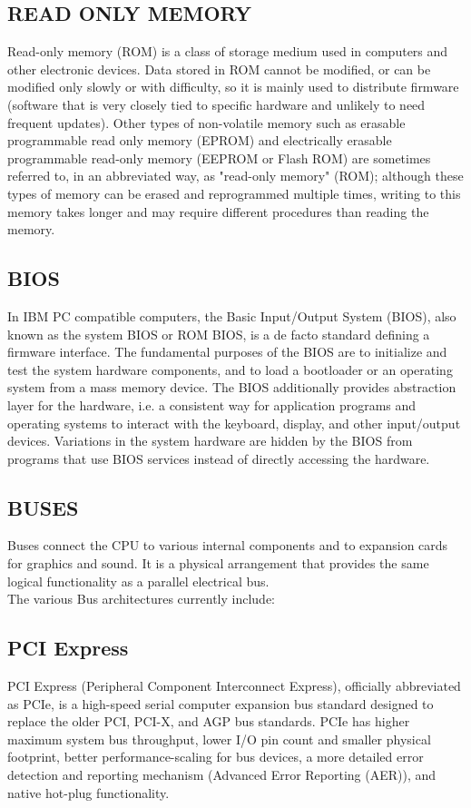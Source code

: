 		\subsection*{READ ONLY MEMORY}
	Read-only memory (ROM) is a class of storage medium used in computers and other electronic devices. Data
	stored in ROM cannot be modified, or can be modified only slowly or with difficulty, so it is mainly used to
	distribute firmware (software that is very closely tied to specific hardware and unlikely to need frequent
	updates). Other types of non-volatile memory such as erasable programmable read only memory (EPROM)
	and electrically erasable programmable read-only memory (EEPROM or Flash ROM) are sometimes referred to,
	in an abbreviated way, as "read-only memory" (ROM); although these types of memory can be erased and reprogrammed
	multiple times, writing to this memory takes longer and may require different procedures than
	reading the memory.
		\subsection*{BIOS}
	In IBM PC compatible computers, the Basic Input/Output System (BIOS), also known as the system
	BIOS or ROM BIOS, is a de facto standard defining a firmware interface. The fundamental purposes of the
	BIOS are to initialize and test the system hardware components, and to load a bootloader or an operating
	system from a mass memory device. The BIOS additionally provides abstraction layer for the hardware, i.e. a
	consistent way for application programs and operating systems to interact with the keyboard, display, and other
	input/output devices. Variations in the system hardware are hidden by the BIOS from programs that use BIOS
	services instead of directly accessing the hardware.
		\subsection*{BUSES}
	Buses connect the CPU to various internal components and to expansion cards for graphics and sound. It is a
	physical arrangement that provides the same logical functionality as a parallel electrical bus.\\
	The various Bus architectures currently include:
			\subsection*{PCI Express}
 	PCI Express (Peripheral Component Interconnect Express), officially abbreviated as PCIe, is
	 a high-speed serial computer expansion bus standard designed to replace the older PCI, PCI-X,
	 and AGP bus standards. PCIe has higher maximum system bus throughput, lower I/O pin count and smaller physical 		footprint,
	 better performance-scaling for bus devices, a more detailed error detection and reporting mechanism
	 (Advanced Error Reporting (AER)), and native hot-plug functionality.
